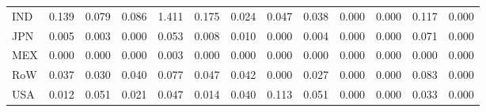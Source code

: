 \begin{table}[htbp]
\begin{tabular}{lcccccccccccc}
  IND & \textcolor[RGB]{13,8,242}{0.139} & \textcolor[RGB]{42,27,212}{0.079} & \textcolor[RGB]{34,22,221}{0.086} & \textcolor[RGB]{0,0,255}{1.411} & \textcolor[RGB]{2,1,253}{0.175} & \textcolor[RGB]{89,58,166}{0.024} & \textcolor[RGB]{64,41,191}{0.047} & \textcolor[RGB]{72,47,183}{0.038} & \textcolor[RGB]{255,165,0}{0.000} & \textcolor[RGB]{255,165,0}{0.000} & \textcolor[RGB]{19,12,236}{0.117} & \textcolor[RGB]{255,165,0}{0.000} \\ 
  JPN & \textcolor[RGB]{113,73,142}{0.005} & \textcolor[RGB]{117,76,138}{0.003} & \textcolor[RGB]{255,165,0}{0.000} & \textcolor[RGB]{51,33,204}{0.053} & \textcolor[RGB]{108,70,147}{0.008} & \textcolor[RGB]{104,67,151}{0.010} & \textcolor[RGB]{255,165,0}{0.000} & \textcolor[RGB]{115,74,140}{0.004} & \textcolor[RGB]{255,165,0}{0.000} & \textcolor[RGB]{255,165,0}{0.000} & \textcolor[RGB]{47,30,208}{0.071} & \textcolor[RGB]{255,165,0}{0.000} \\ 
  MEX & \textcolor[RGB]{255,165,0}{0.000} & \textcolor[RGB]{255,165,0}{0.000} & \textcolor[RGB]{255,165,0}{0.000} & \textcolor[RGB]{117,76,138}{0.003} & \textcolor[RGB]{125,81,130}{0.000} & \textcolor[RGB]{255,165,0}{0.000} & \textcolor[RGB]{255,165,0}{0.000} & \textcolor[RGB]{255,165,0}{0.000} & \textcolor[RGB]{255,165,0}{0.000} & \textcolor[RGB]{255,165,0}{0.000} & \textcolor[RGB]{255,165,0}{0.000} & \textcolor[RGB]{255,165,0}{0.000} \\ 
  RoW & \textcolor[RGB]{74,48,181}{0.037} & \textcolor[RGB]{83,54,172}{0.030} & \textcolor[RGB]{68,44,187}{0.040} & \textcolor[RGB]{45,29,210}{0.077} & \textcolor[RGB]{59,38,196}{0.047} & \textcolor[RGB]{66,43,189}{0.042} & \textcolor[RGB]{125,81,130}{0.000} & \textcolor[RGB]{85,55,170}{0.027} & \textcolor[RGB]{255,165,0}{0.000} & \textcolor[RGB]{255,165,0}{0.000} & \textcolor[RGB]{38,25,217}{0.083} & \textcolor[RGB]{255,165,0}{0.000} \\ 
  USA & \textcolor[RGB]{102,66,153}{0.012} & \textcolor[RGB]{53,34,202}{0.051} & \textcolor[RGB]{91,59,164}{0.021} & \textcolor[RGB]{62,40,193}{0.047} & \textcolor[RGB]{100,65,155}{0.014} & \textcolor[RGB]{70,45,185}{0.040} & \textcolor[RGB]{23,15,232}{0.113} & \textcolor[RGB]{55,36,200}{0.051} & \textcolor[RGB]{255,165,0}{0.000} & \textcolor[RGB]{255,165,0}{0.000} & \textcolor[RGB]{77,50,178}{0.033} & \textcolor[RGB]{255,165,0}{0.000} \\ 
   \hline
\end{tabular}
\end{table}
